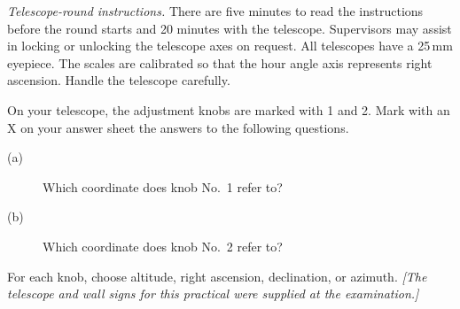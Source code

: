 \textit{Telescope-round instructions.} There are five minutes to read the instructions before the round starts and 20 minutes with the telescope. Supervisors may assist in locking or unlocking the telescope axes on request. All telescopes have a 25\,mm eyepiece. The scales are calibrated so that the hour angle axis represents right ascension. Handle the telescope carefully.

On your telescope, the adjustment knobs are marked with 1 and 2. Mark with an X on your answer sheet the answers to the following questions.
\begin{description}
\item[(a)] Which coordinate does knob No.\ 1 refer to?
\item[(b)] Which coordinate does knob No.\ 2 refer to?
\end{description}
For each knob, choose altitude, right ascension, declination, or azimuth.
\textit{[The telescope and wall signs for this practical were supplied at the examination.]}
